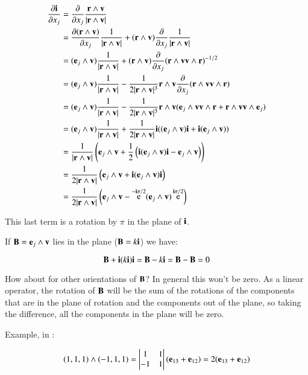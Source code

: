 \documentclass{article}      %
\newcommand{\dxj}[2] {\frac {\partial {#1}} {\partial {x_{#2}}}}
\DeclareMathOperator{\Exp}{e}
\begin{document}
\begin{align*}
\dxj{\Bi}{j}
&= \dxj{}{j} \frac{\Br \wedge \Bv}{\abs{\Br \wedge \Bv}} \\
&= \dxj{(\Br \wedge \Bv)}{j} \inv{\abs{\Br \wedge \Bv}} + {(\Br \wedge \Bv)} \dxj{}{j} \inv{\abs{\Br \wedge \Bv}} \\
&= (\Be_j \wedge \Bv) \inv{\abs{\Br \wedge \Bv}} + (\Br \wedge \Bv) \dxj{}{j} {(\Br \wedge \Bv \Bv \wedge \Br)}^{-1/2} \\
&= (\Be_j \wedge \Bv) \inv{\abs{\Br \wedge \Bv}} -\inv{2 \abs{\Br \wedge \Bv}^3} {\Br \wedge \Bv} \dxj{}{j} ({\Br \wedge \Bv}{\Bv \wedge \Br}) \\
&= (\Be_j \wedge \Bv) \inv{\abs{\Br \wedge \Bv}} -\inv{2 \abs{\Br \wedge \Bv}^3} {\Br \wedge \Bv} (\Be_j \wedge \Bv\Bv \wedge \Br + \Br \wedge \Bv\Bv \wedge \Be_j) \\
&= (\Be_j \wedge \Bv) \inv{\abs{\Br \wedge \Bv}} +\inv{2 \abs{\Br \wedge \Bv}} \Bi ((\Be_j \wedge \Bv) \Bi + \Bi (\Be_j \wedge \Bv)) \\
&= \inv{\abs{\Br \wedge \Bv}} \left( \Be_j \wedge \Bv  +\inv{2}\left( \Bi(\Be_j \wedge \Bv)\Bi - \Be_j \wedge \Bv \right) \right) \\
&= \inv{2 \abs{\Br \wedge \Bv}} \left( \Be_j \wedge \Bv  + \Bi(\Be_j \wedge \Bv)\Bi \right) \\
&= \inv{2 \abs{\Br \wedge \Bv}} \left( \Be_j \wedge \Bv  - \Exp^{-\Bi \pi/2}(\Be_j \wedge \Bv)\Exp^{\Bi \pi/2} \right) \\
\end{align*}

This last term is a rotation by $\pi$ in the plane of $\mathbf{i}$.

If $\mathbf{B} = \mathbf{e}_j \wedge \mathbf{v}$ lies in the plane ($\mathbf{B} = k\mathbf{i}$) we have:

\[
\mathbf{B} + \mathbf{i} (k\mathbf{i}) \mathbf{i} = \mathbf{B} - k\mathbf{i} = \mathbf{B} - \mathbf{B} = 0
\]

How about for other orientations of $\mathbf{B}$?  In general this won't be zero.  As a linear operator, the rotation of $\mathbf{B}$ will be the sum of the
rotations of the components that are in the plane of rotation and the components out of the plane, so taking the difference, all the components in the plane
will be zero.

Example, in :

\[
(1,1,1)\wedge(-1,1,1) = 
\begin{vmatrix}
 1 & 1 \\
 -1 & 1 \\
\end{vmatrix}(\mathbf{e}_{13} + \mathbf{e}_{12}) = 2(\mathbf{e}_{13} + \mathbf{e}_{12})
\]
\end{document}

